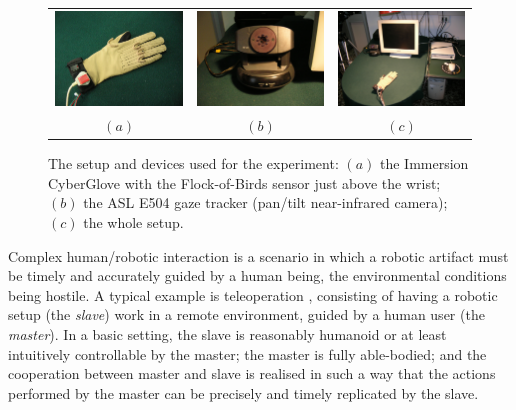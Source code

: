 \documentclass[a4paper,10pt,conference]{ieeeconf}
\begin{document}
\begin{figure}[ht]
  \begin{center}
    \begin{tabular}{ccc}
      \includegraphics[width=0.31\linewidth]{glove.eps} &
      \includegraphics[width=0.31\linewidth]{e504.eps} &
      \includegraphics[width=0.31\linewidth]{setup.eps} \\
      $(a)$ & $(b)$ & $(c)$
    \end{tabular}
    \caption{The setup and devices used for the experiment: $(a)$ the
    Immersion CyberGlove with the Flock-of-Birds sensor just above the
    wrist; $(b)$ the ASL E504 gaze tracker (pan/tilt near-infrared
    camera); $(c)$ the whole setup.}
    \label{fig:devices}
  \end{center}
\end{figure}

Complex human/robotic interaction is a scenario in which a robotic
artifact must be timely and accurately guided by a human being, the
environmental conditions being hostile. A typical example is
teleoperation \cite{...}, consisting of having a robotic setup (the
\emph{slave}) work in a remote environment, guided by a human user
(the \emph{master}). In a basic setting, the slave is reasonably
humanoid or at least intuitively controllable by the master; the
master is fully able-bodied; and the cooperation between master and
slave is realised in such a way that the actions performed by the
master can be precisely and timely replicated by the slave.
\end{document}
